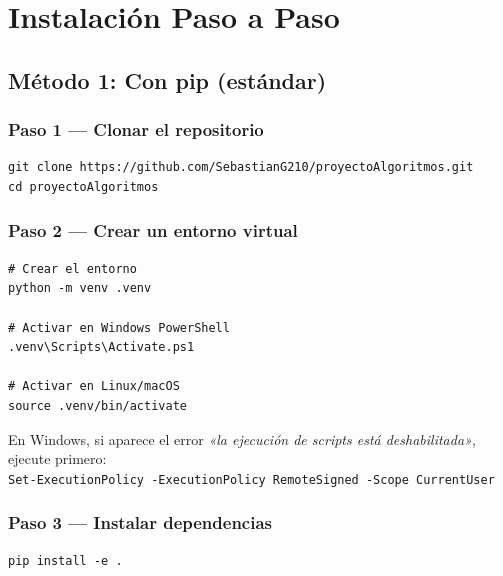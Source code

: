 \section{Instalación Paso a Paso}
\label{sec:instalacion}

\subsection{Método 1: Con pip (estándar)}

\subsubsection{Paso 1 — Clonar el repositorio}

\begin{lstlisting}[style=shell, caption={Clonar el repositorio desde GitHub.}]
git clone https://github.com/SebastianG210/proyectoAlgoritmos.git
cd proyectoAlgoritmos
\end{lstlisting}

\subsubsection{Paso 2 — Crear un entorno virtual}

\begin{lstlisting}[style=shell, caption={Crear y activar el entorno virtual.}]
# Crear el entorno
python -m venv .venv

# Activar en Windows PowerShell
.venv\Scripts\Activate.ps1

# Activar en Linux/macOS
source .venv/bin/activate
\end{lstlisting}

\begin{aviso}
En Windows, si aparece el error \textit{«la ejecución de scripts está deshabilitada»}, ejecute primero:\\
\lstinline|Set-ExecutionPolicy -ExecutionPolicy RemoteSigned -Scope CurrentUser|
\end{aviso}

\subsubsection{Paso 3 — Instalar dependencias}

\begin{lstlisting}[style=shell, caption={Instalar el proyecto en modo editable.}]
pip install -e .
\end{lstlisting}

